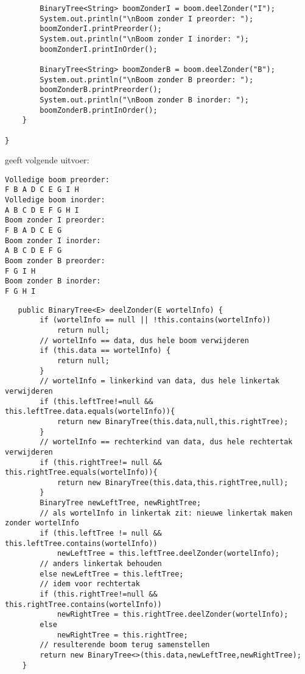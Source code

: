 \begin{oef}
\begin{lstlisting}
        BinaryTree<String> boomZonderI = boom.deelZonder("I");
        System.out.println("\nBoom zonder I preorder: ");
        boomZonderI.printPreorder();
        System.out.println("\nBoom zonder I inorder: ");
        boomZonderI.printInOrder();

        BinaryTree<String> boomZonderB = boom.deelZonder("B");
        System.out.println("\nBoom zonder B preorder: ");
        boomZonderB.printPreorder();
        System.out.println("\nBoom zonder B inorder: ");
        boomZonderB.printInOrder();
    }

}
\end{lstlisting}

geeft volgende uitvoer:
\begin{lstlisting}
Volledige boom preorder:
F B A D C E G I H 
Volledige boom inorder:
A B C D E F G H I 
Boom zonder I preorder: 
F B A D C E G 
Boom zonder I inorder: 
A B C D E F G 
Boom zonder B preorder: 
F G I H 
Boom zonder B inorder: 
F G H I 
\end{lstlisting}
\begin{opl}
\begin{lstlisting}
   public BinaryTree<E> deelZonder(E wortelInfo) {
        if (wortelInfo == null || !this.contains(wortelInfo))
            return null;
        // wortelInfo == data, dus hele boom verwijderen
        if (this.data == wortelInfo) {
            return null;
        }
        // wortelInfo = linkerkind van data, dus hele linkertak verwijderen
        if (this.leftTree!=null && this.leftTree.data.equals(wortelInfo)){
            return new BinaryTree(this.data,null,this.rightTree);
        }
        // wortelInfo == rechterkind van data, dus hele rechtertak verwijderen
        if (this.rightTree!= null && this.rightTree.equals(wortelInfo)){
            return new BinaryTree(this.data,this.rightTree,null);
        }
        BinaryTree newLeftTree, newRightTree;
        // als wortelInfo in linkertak zit: nieuwe linkertak maken zonder wortelInfo
        if (this.leftTree != null && this.leftTree.contains(wortelInfo))
            newLeftTree = this.leftTree.deelZonder(wortelInfo);
        // anders linkertak behouden
        else newLeftTree = this.leftTree;
        // idem voor rechtertak
        if (this.rightTree!=null && this.rightTree.contains(wortelInfo))
            newRightTree = this.rightTree.deelZonder(wortelInfo);
        else
            newRightTree = this.rightTree;
        // resulterende boom terug samenstellen
        return new BinaryTree<>(this.data,newLeftTree,newRightTree);
    }
\end{lstlisting}
\end{opl}
\end{oef}




